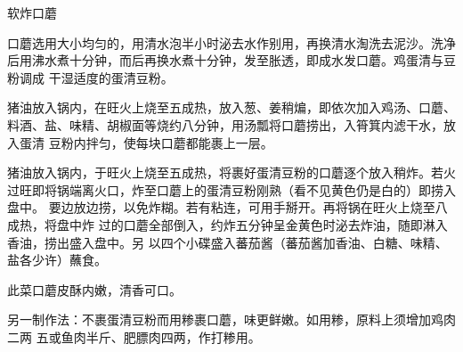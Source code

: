 \begin{recipe}{软炸口蘑}

\ingredients


\preparation

\step 口蘑选用大小均匀的，用清水泡半小时泌去水作别用，再换清水淘洗去泥沙。洗净
后用沸水煮十分钟，而后再换水煮十分钟，发至胀透，即成水发口蘑。鸡蛋清与豆粉调成
干湿适度的蛋清豆粉。

\step 猪油放入锅内，在旺火上烧至五成热，放入葱、姜稍煸，即依次加入鸡汤、口蘑、
料酒、盐、味精、胡椒面等烧约八分钟，用汤瓢将口蘑捞出，入筲箕内滤干水，放入蛋清
豆粉内拌匀，使每块口蘑都能裹上一层。

\step 猪油放入锅内，于旺火上烧至五成热，将裹好蛋清豆粉的口蘑逐个放入稍炸。若火
过旺即将锅端离火口，炸至口蘑上的蛋清豆粉刚熟（看不见黄色仍是白的）即捞入盘中。
要边放边捞，以免炸糊。若有粘连，可用手掰开。再将锅在旺火上烧至八成热，将盘中炸
过的口蘑全部倒入，约炸五分钟呈金黄色时泌去炸油，随即淋入香油，捞出盛入盘中。另
以四个小碟盛入蕃茄酱（蕃茄酱加香油、白糖、味精、盐各少许）蘸食。

\features

此菜口蘑皮酥内嫩，清香可口。

另一制作法：不裹蛋清豆粉而用糁裹口蘑，味更鲜嫩。如用糁，原料上须增加鸡肉二两
五或鱼肉半斤、肥膘肉四两，作打糁用。

\end{recipe}

